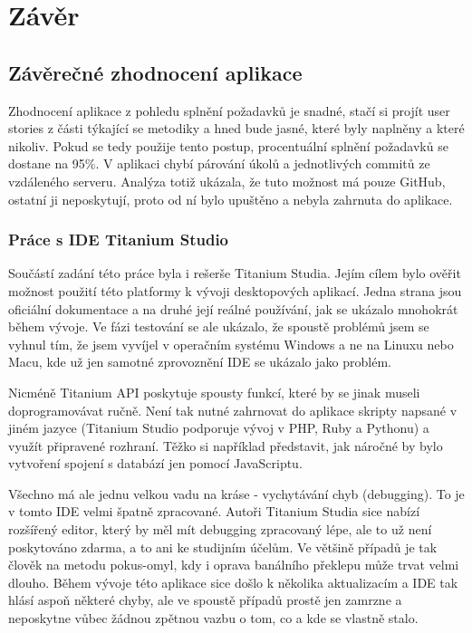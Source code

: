 \chapter{Závěr}

\section{Závěrečné zhodnocení aplikace}

Zhodnocení aplikace z pohledu splnění požadavků je snadné, stačí si projít user stories z části týkající se metodiky a hned bude jasné, které byly naplněny a které nikoliv. Pokud se tedy použije tento postup, procentuální splnění požadavků se dostane na 95\%. V aplikaci chybí párování úkolů a jednotlivých commitů ze vzdáleného serveru. Analýza totiž ukázala, že tuto možnost má pouze GitHub, ostatní ji neposkytují, proto od ní bylo upuštěno a nebyla zahrnuta do aplikace.

\subsection{Práce s IDE Titanium Studio}

Součástí zadání této práce byla i rešerše Titanium Studia. Jejím cílem bylo ověřit možnost použití této platformy k vývoji desktopových aplikací. Jedna strana jsou oficiální dokumentace a na druhé její reálné používání, jak se ukázalo mnohokrát během vývoje. Ve fázi testování se ale ukázalo, že spoustě problémů jsem se vyhnul tím, že jsem vyvíjel v operačním systému Windows a ne na Linuxu nebo Macu, kde už jen samotné zprovoznění IDE se ukázalo jako problém.

Nicméně Titanium API poskytuje spousty funkcí, které by se jinak museli doprogramovávat ručně. Není tak nutné zahrnovat do aplikace skripty napsané v jiném jazyce (Titanium Studio podporuje vývoj v PHP, Ruby a Pythonu) a využít připravené rozhraní. Těžko si například představit, jak náročné by bylo vytvoření spojení s databází jen pomocí JavaScriptu.

Všechno má ale jednu velkou vadu na kráse - vychytávání chyb (debugging). To je v tomto IDE velmi špatně zpracované. Autoři Titanium Studia sice nabízí rozšířený editor, který by měl mít debugging zpracovaný lépe, ale to už není poskytováno zdarma, a to ani ke studijním účelům. Ve většině případů je tak člověk na metodu pokus-omyl, kdy i oprava banálního překlepu může trvat velmi dlouho. Během vývoje této aplikace sice došlo k několika aktualizacím a IDE tak hlásí aspoň některé chyby, ale ve spoustě případů prostě jen zamrzne a neposkytne vůbec žádnou zpětnou vazbu o tom, co a kde se vlastně stalo.

